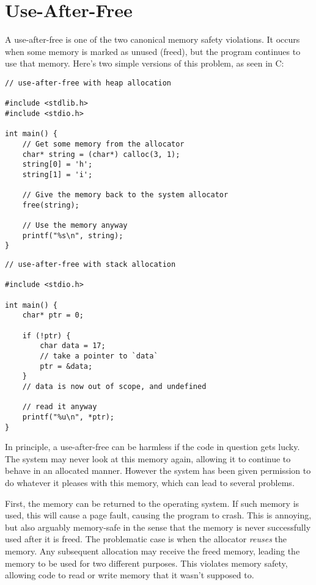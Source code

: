 \section{Use-After-Free}

A use-after-free is one of the two canonical memory safety violations. It
occurs when some memory is marked as unused (freed), but the program
continues to use that memory. Here's two simple versions of this problem, as
seen in C:

\begin{verbatim}
// use-after-free with heap allocation

#include <stdlib.h>
#include <stdio.h>

int main() {
    // Get some memory from the allocator
    char* string = (char*) calloc(3, 1);
    string[0] = 'h';
    string[1] = 'i';

    // Give the memory back to the system allocator
    free(string);

    // Use the memory anyway
    printf("%s\n", string);
}

\end{verbatim}

\begin{verbatim}
// use-after-free with stack allocation

#include <stdio.h>

int main() {
    char* ptr = 0;

    if (!ptr) {
        char data = 17;
        // take a pointer to `data`
        ptr = &data;
    }
    // data is now out of scope, and undefined

    // read it anyway
    printf("%u\n", *ptr);
}
\end{verbatim}

In principle, a use-after-free can be harmless if the code in question gets lucky.
The system may never look at this memory again, allowing it to continue to
behave in an allocated manner. However the system has been given permission
to do whatever it pleases with this memory, which can lead to several problems.

First, the memory can be returned to the operating system. If such memory is
used, this will cause a page fault, causing the program to crash.
This is annoying, but also arguably memory-safe in the sense that the memory
is never successfully used after it is freed. The problematic case is when the
allocator \emph{reuses} the memory. Any subsequent allocation may receive the
freed memory, leading the memory to be used for two different purposes. This
violates memory safety, allowing code to read or write memory that it wasn't
supposed to.

